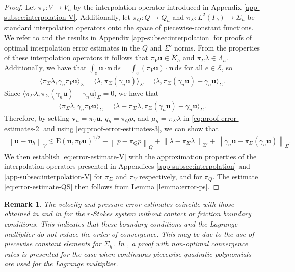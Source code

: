 \documentclass[onefignum,onetabnum]{siamart190516}
\newcommand{\bn}{\boldsymbol{n}}
\newcommand{\bu}{\boldsymbol{u}}
\newcommand{\bv}{\boldsymbol{v}}
\newcommand{\bE}{\mathrm{E}}
\newcommand{\dd}{\mathrm{d}}
\newcommand{\nrm}[1]{\left\lVert#1\right\rVert}
\newcommand{\red}[1]{\textcolor{red}{#1}}
\newcommand{\Ko}{\mathring{K}}
\newcommand{\Ec}{\mathcal{E}}
\newtheorem{remark}[theorem]{Remark}
\begin{document}
\begin{proof}
	Let $\pi_V:V\to V_h$ by the interpolation operator introduced in Appendix \ref{app-subsec:interpolation-V}. Additionally, let $\pi_Q:Q\to Q_h$ and $\pi_\Sigma:L^2(\Gamma_b)\to \Sigma_h$ be standard interpolation operators onto the space of piecewise-constant functions. We refer to \cite{ern2017} and the results in Appendix \ref{app-subsec:interpolation} for proofs of optimal interpolation error estimates in the $Q$ and $\Sigma'$ norms. From the properties of these interpolation operators it follows that $\pi_V\bu\in \Ko_h$ and $\pi_\Sigma\lambda\in\Lambda_h$. Additionally, we have that $\int_e \bu\cdot\bn\,\dd s = \int_e (\pi_V\bu)\cdot\bn\,\dd s$ for all $e\in \Ec$, so 
	\begin{align*}
		\langle \pi_\Sigma\lambda, \gamma_n\pi_V\bu \rangle_\Sigma = \langle \lambda, \pi_\Sigma(\gamma_n\bu)\rangle_\Sigma = \langle \lambda, \pi_\Sigma(\gamma_n\bu) - \gamma_n\bu\rangle_\Sigma.
	\end{align*}
	Since $\langle \pi_\Sigma\lambda, \pi_\Sigma(\gamma_n\bu) - \gamma_n\bu\rangle_\Sigma = 0$, we have that 
	\begin{align}\label{eq:proof-error-estimates-3}
		\langle \pi_\Sigma\lambda, \gamma_n\pi_V\bu \rangle_\Sigma = \langle \lambda - \pi_\Sigma\lambda, \pi_\Sigma(\gamma_n\bu) - \gamma_n\bu\rangle_\Sigma.
	\end{align}
	Therefore, by setting $\bv_h = \pi_V\bu$, $q_h = \pi_Qp$, and $\mu_h = \pi_\Sigma\lambda$ in \eqref{eq:proof-error-estimates-2} and using \eqref{eq:proof-error-estimates-3}, we can show that 
	\begin{align}
		\nrm{\bu - \bu_h}_V \lesssim \bE(\bu,\pi_V\bu)^{1/2} + \nrm{p - \pi_Qp}_Q + \nrm{\lambda - \pi_\Sigma\lambda}_{\Sigma'} + \nrm{\gamma_n\bu - \pi_\Sigma(\gamma_n\bu)}_{\Sigma}.
	\end{align}	
	We then establish \eqref{eq:error-estimate-V} with the approximation properties of the interpolation operators presented in Appendices \ref{app-subsec:interpolation} and \ref{app-subsec:interpolation-V} for $\pi_\Sigma$ and $\pi_V$ respectively, and \cite{ern2017} for $\pi_Q$. The estimate \eqref{eq:error-estimate-QS} then follows from Lemma \ref{lemma:error-ps}.
\end{proof}

\begin{remark}
	The velocity and pressure error estimates coincide with those obtained in \cite[Theorem 2.14]{belenki2012} and in \cite[Theorem 3.1]{hirn2013} for the $r$-Stokes system without contact or friction boundary conditions. This indicates that these boundary conditions and the Lagrange multiplier do not reduce the order of convergence. This may be due to the use of piecewise constant elements for $\Sigma_h$. In \cite{coorevits2002}, a proof with non-optimal convergence rates is presented for the case when continuous piecewise quadratic polynomials are used for the Lagrange multiplier.
\end{remark}
\end{document}
